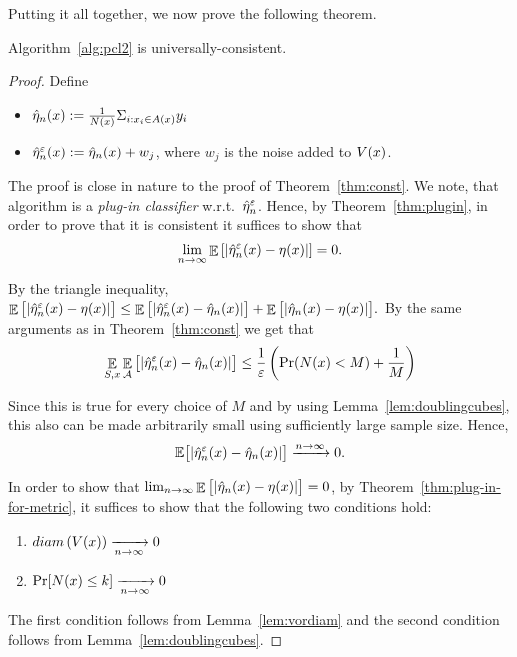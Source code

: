 \documentclass[12pt,a4paper,oneside,onecolumn]{book}
\begin{document}
Putting it all together, we now prove the following theorem.

\begin{theorem}
\label{thm:pcl2_is_ucl}
  Algorithm~\ref{alg:pcl2} is universally-consistent. 
\end{theorem}

\begin{proof}

Define
\begin{itemize}
    \item $\hat{\eta}_n(x) := \frac{1}{N(x)} \Sigma_{i:x_i \in A(x) }y_i
    $
    \item $\hat{\eta}^{\varepsilon}_n(x) := \hat{\eta}_n(x) + w_j$, where $w_j$ is the noise added to $V(x)$.
\end{itemize}

The proof is close in nature to the proof of Theorem~\ref{thm:const}.
We note, that algorithm  is a {\em plug-in classifier} w.r.t.\ $\hat{\eta}^{\varepsilon}_n$. Hence, by Theorem~\ref{thm:plugin}, in order to prove that it is consistent it suffices to show that
\[
  \lim_{n\to\infty}\mathop{\mathbb{E}}\left[|\hat{\eta}_n^\varepsilon(x)-\eta(x) |\right] = 0.
\]

By the triangle inequality, 
$
\label{eq:classif2}
  \mathop{\mathbb{E}}\big[|\hat{\eta}^{\varepsilon}_n(x)-\eta(x) |\big]
  \leq 
         \mathop{\mathbb{E}}\big[|\hat{\eta}^{\varepsilon}_n(x)-\hat{\eta}_n(x) |\big]
  + \mathop{\mathbb{E}}\big[|\hat{\eta}_n(x) - \eta(x) |\big].    
$
By the same arguments as in Theorem~\ref{thm:const} we get that
\begin{equation}
\label{eq:ddim_noise_bound}
 \mathop{\mathbb{E}}_{S,x}\mathop{\mathbb{E}}_{\mathcal{A}}\big[|\hat\eta^{\varepsilon}_n(x)-\hat\eta_n(x) |\big] \leq  
    \frac{1}{\varepsilon} \left(\Pr(N(x) < M) 
    + \frac{1}{M}
    \right) 
\end{equation}

Since this is true for every choice of $M$
and by using  Lemma~\ref{lem:doublingcubes},
this also can be made arbitrarily small using sufficiently large sample size.
Hence, 
\begin{equation}
    \label{eq:doublin-noise-decay}
    \mathbb{E}\big[|\hat\eta^{\varepsilon}_n(x)-\hat\eta_n(x) |\big] \xrightarrow[]{n\to\infty} 0.
\end{equation}

In order to show that 
$\lim_{n\to\infty}\mathop{\mathbb{E}}\big[|\hat{\eta}_n(x) - \eta(x) |\big] = 0$, by Theorem~\ref{thm:plug-in-for-metric}, it suffices to show that the following two conditions hold:
\begin{enumerate}
    \item $diam\left(V(x)\right) \xrightarrow[n\to \infty]{} 0$
    \item $\Pr[N(x)\leq k] \xrightarrow[n\to \infty]{} 0$
\end{enumerate}
The first condition follows from Lemma~\ref{lem:vordiam} and the second condition follows from Lemma~\ref{lem:doublingcubes}.
\end{proof}
\end{document}
